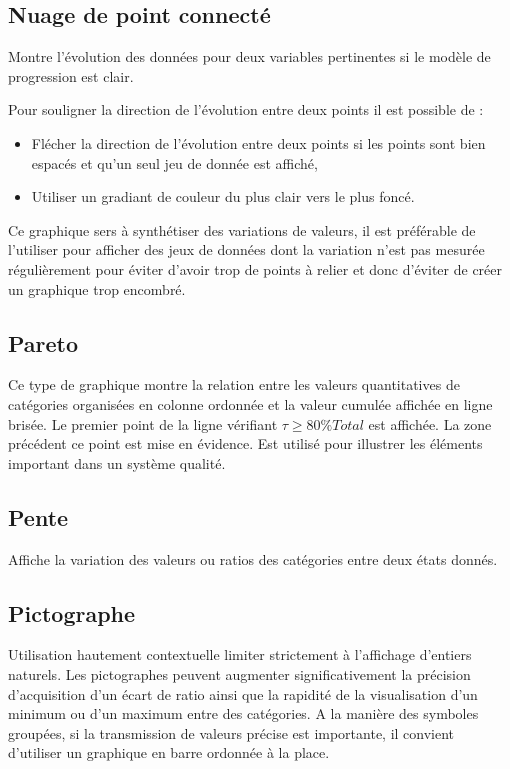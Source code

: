 \documentclass[a4paper,12pt]{article}
\begin{document}
\begin{multicols}{2}
\subsection*{Nuage de point connecté}
\label{sec:orgbab9228}
Montre l'évolution des données pour deux variables pertinentes si le modèle de progression est clair. \autocite{alansmithLexiqueVisuel}

Pour souligner la direction de l'évolution entre deux points il est possible de :
\begin{itemize}
\item Flécher la direction de l'évolution entre deux points si les points sont bien espacés et qu'un seul jeu de donnée est affiché, \autocite{jonathanschwabishComparingCategories2021}
\item Utiliser un gradiant de couleur du plus clair vers le plus foncé.
\end{itemize}

Ce graphique sers à synthétiser des variations de valeurs, il est préférable de l'utiliser pour afficher des jeux de données dont la variation n'est pas mesurée régulièrement pour éviter d'avoir trop de points à relier et donc d'éviter de créer un graphique trop encombré. \autocite{jonathanschwabishComparingCategories2021}
\subsection*{Pareto}
\label{sec:orgbb581f4}
Ce type de graphique montre la relation entre les valeurs quantitatives de catégories organisées en colonne ordonnée et la valeur cumulée affichée en ligne brisée. Le premier point de la ligne vérifiant \(\tau\geq80\%Total\) est affichée. La zone précédent ce point est mise en évidence.
Est utilisé pour illustrer les éléments important dans un système qualité.
\subsection*{Pente}
\label{sec:orgd56dcbf}
Affiche la variation des valeurs ou ratios des catégories entre deux états donnés. \autocite{alansmithLexiqueVisuel}
\subsection*{Pictographe}
\label{sec:org035a4a2}
Utilisation hautement contextuelle limiter strictement à l'affichage d'entiers naturels. \autocite{alansmithLexiqueVisuel}
Les pictographes peuvent augmenter significativement la précision d'acquisition d'un écart de ratio ainsi que la rapidité de la visualisation d'un minimum ou d'un maximum entre des catégories. \autocite{tranDiscoveringAccessibleData2024} A la manière des symboles groupées, si la transmission de valeurs précise est importante, il convient d'utiliser un graphique en barre ordonnée à la place. \autocite{tranDiscoveringAccessibleData2024}

\end{multicols}
\end{document}
